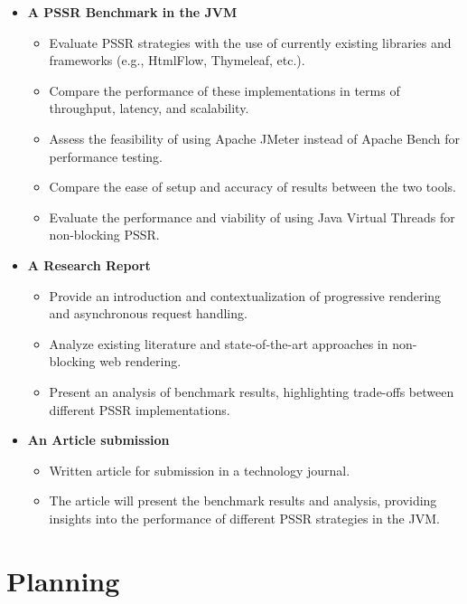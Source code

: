 \documentclass[a4paper,twoside,11pt]{article}
\begin{document}
\begin{itemize}
  \item \textbf{A PSSR Benchmark in the JVM}
  \begin{itemize}
    \item Evaluate PSSR strategies with the use of currently existing libraries and frameworks (e.g., HtmlFlow, Thymeleaf, etc.).
    \item Compare the performance of these implementations in terms of throughput, latency, and scalability.
    \item Assess the feasibility of using Apache JMeter instead of Apache Bench for performance testing.
    \item Compare the ease of setup and accuracy of results between the two tools.
    \item Evaluate the performance and viability of using Java Virtual Threads for non-blocking PSSR.
  \end{itemize}

  \item \textbf{A Research Report}
  \begin{itemize}
    \item Provide an introduction and contextualization of progressive rendering and asynchronous request handling.
    \item Analyze existing literature and state-of-the-art approaches in non-blocking web rendering.
    \item Present an analysis of benchmark results, highlighting trade-offs between different PSSR implementations.
  \end{itemize}

  \item \textbf{An Article submission}
  \begin{itemize}
    \item Written article for submission in a technology journal.
    \item The article will present the benchmark results and analysis, providing insights into the performance of different PSSR strategies in the JVM.
  \end{itemize}
\end{itemize}

\section{Planning}
\end{document}
